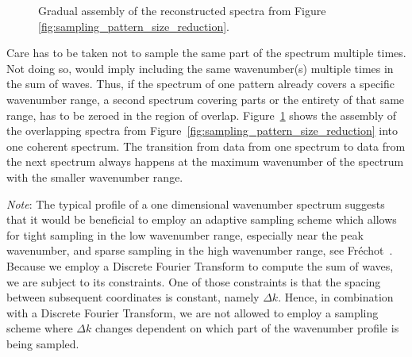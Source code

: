 \begin{figure}
\caption{Gradual assembly of the reconstructed spectra from Figure
\ref{fig:sampling_pattern_size_reduction}.}
\label{fig:sampling_pattern_assembly}
\end{figure}
%
Care has to be taken not to sample the same part of the spectrum multiple times.
Not doing so, would imply including the same wavenumber(s) multiple times in the
sum of waves. Thus, if the spectrum of one pattern already covers a specific
wavenumber range, a second spectrum covering parts or the entirety of that same
range, has to be zeroed in the region of overlap.
Figure~\ref{fig:sampling_pattern_assembly} shows the assembly of the overlapping
spectra from Figure~\ref{fig:sampling_pattern_size_reduction} into one coherent
spectrum. The transition from data from one spectrum to data from the next
spectrum always happens at the maximum wavenumber of the spectrum with the
smaller wavenumber range.

\emph{Note}: The typical profile of a one dimensional wavenumber spectrum suggests
that it would be beneficial to employ an adaptive sampling scheme which allows
for tight sampling in the low wavenumber range, especially near the peak
wavenumber, and sparse sampling in the high wavenumber range, see
Fr\'{e}chot~\cite{article:frechot2007}. Because we employ a Discrete Fourier
Transform to compute the sum of waves, we are subject to its constraints. One of
those constraints is that the spacing between subsequent coordinates is constant,
namely $\Delta k$. Hence, in combination with a Discrete Fourier Transform, we
are not allowed to employ a sampling scheme where $\Delta k$ changes dependent
on which part of the wavenumber profile is being sampled.


